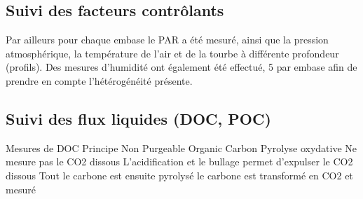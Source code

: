 \subsection{Suivi des facteurs contrôlants}
Par ailleurs pour chaque embase le PAR a été mesuré, ainsi que la pression atmosphérique, la température de l'air et de la tourbe à différente profondeur (profils). Des mesures d'humidité ont également été effectué, 5 par embase afin de prendre en compte l'hétérogénéité présente.
\subsection{Suivi des flux liquides (DOC, POC)}
Mesures de DOC
Principe
Non Purgeable Organic Carbon
Pyrolyse oxydative
Ne mesure pas le CO2 dissous
L'acidification et le bullage permet d'expulser le CO2 dissous
Tout le carbone est ensuite pyrolysé le carbone est transformé en CO2 et mesuré
